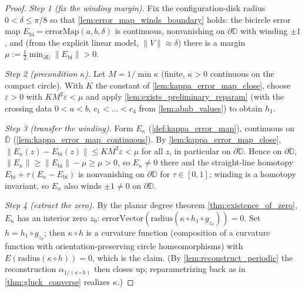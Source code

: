 \begin{proof}
        \leanok
  \emph{Step 1 (fix the winding margin).} Fix the configuration-disk radius
  $0<\delta\le\pi/8$ so that \cref{lem:error_map_winds_boundary} holds: the
  bicircle error map $E_{\mathrm{bi}} = \mathrm{errorMap}(a,b,\delta)$ is
  continuous, nonvanishing on $\partial\mathbb{D}$ with winding $\pm1$, and (from
  the explicit linear model, $\lVert V\rVert\approx\delta$) there is a margin
  $\mu := \tfrac12\min_{\partial\mathbb{D}}\lVert E_{\mathrm{bi}}\rVert > 0$.

  \emph{Step 2 (precondition $\kappa$).} Let $M=1/\min\kappa$ (finite, $\kappa>0$
  continuous on the compact circle). With $K$ the constant of
  \cref{lem:kappa_error_map_close}, choose $\varepsilon>0$ with $K M^2\varepsilon<\mu$
  and apply \cref{lem:exists_preliminary_reparam} (with the crossing data
  $0<a<b$, $c_1<\dots<c_4$ from \cref{lem:abab_values}) to obtain $h_1$.

  \emph{Step 3 (transfer the winding).} Form $E_\kappa$ (\cref{def:kappa_error_map}),
  continuous on $\overline{\mathbb{D}}$ (\cref{lem:kappa_error_map_continuous}). By
  \cref{lem:kappa_error_map_close}, $\lVert E_\kappa(z)-E_{\mathrm{bi}}(z)\rVert\le
  K M^2\varepsilon<\mu$ for all $z$, in particular on $\partial\mathbb{D}$. Hence
  on $\partial\mathbb{D}$, $\lVert E_\kappa\rVert\ge\lVert E_{\mathrm{bi}}\rVert-\mu
  \ge\mu>0$, so $E_\kappa\ne0$ there and the straight-line homotopy
  $E_{\mathrm{bi}}+\tau(E_\kappa-E_{\mathrm{bi}})$ is nonvanishing on
  $\partial\mathbb{D}$ for $\tau\in[0,1]$; winding is a homotopy invariant, so
  $E_\kappa$ also winds $\pm1\ne0$ on $\partial\mathbb{D}$.

  \emph{Step 4 (extract the zero).} By the planar degree theorem
  \cref{thm:existence_of_zero}, $E_\kappa$ has an interior zero $z_0$:
  $\mathrm{errorVector}(\mathrm{radius}(\kappa\circ h_1\circ g_{z_0}))=0$. Set
  $h = h_1\circ g_{z_0}$; then $\kappa\circ h$ is a curvature function (composition
  of a curvature function with orientation-preserving circle homeomorphisms) with
  $E(\mathrm{radius}(\kappa\circ h))=0$, which is the claim. (By
  \cref{lem:reconstruct_periodic} the reconstruction $\alpha_{1/(\kappa\circ h)}$ then closes
  up; reparametrizing back as in \cref{thm:gluck_converse} realizes $\kappa$.)


\end{proof}
